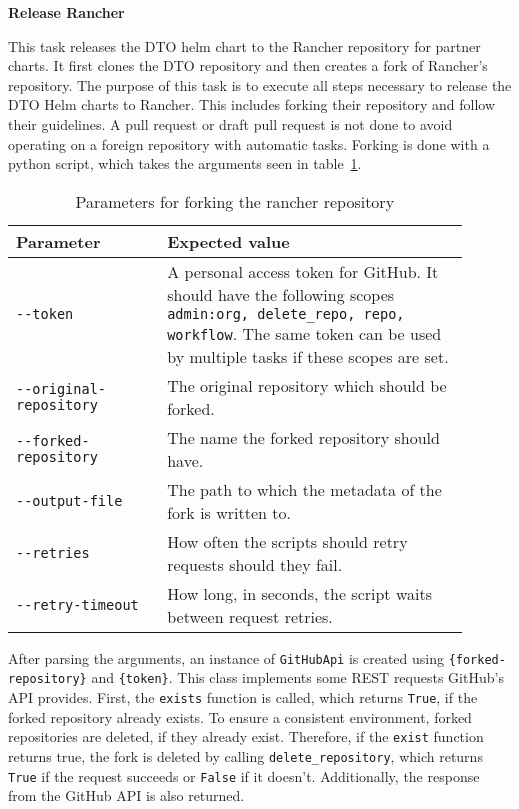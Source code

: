 \textbf{Release Rancher}

This task releases the DTO helm chart to the Rancher repository for partner charts.
It first clones the DTO repository and then creates a fork of Rancher's repository.
The purpose of this task is to execute all steps necessary to release the DTO Helm charts to Rancher.
This includes forking their repository and follow their guidelines.
A pull request or draft pull request is not done to avoid operating on a foreign repository with automatic tasks.
Forking is done with a python script, which takes the arguments seen in table~\ref{tab:parameters-for-forking-the-rancher-repository}.

\begin{table}[H]
    \centering
    \caption{Parameters for forking the rancher repository}
    \label{tab:parameters-for-forking-the-rancher-repository}
    \begin{tabular}{p{0.3\linewidth}|p{0.6\linewidth}}
        Parameter & Expected value \\
        \hline
        \verb|--token| & A personal access token for GitHub.
            It should have the following scopes \verb|admin:org, delete_repo, repo, workflow|.
            The same token can be used by multiple tasks if these scopes are set. \\
        \verb|--original-repository| & The original repository which should be forked. \\
        \verb|--forked-repository| & The name the forked repository should have. \\
        \verb|--output-file| & The path to which the metadata of the fork is written to. \\
        \verb|--retries| & How often the scripts should retry requests should they fail. \\
        \verb|--retry-timeout| & How long, in seconds, the script waits between request retries. \\
    \end{tabular}
\end{table}

After parsing the arguments, an instance of \verb|GitHubApi| is created using \verb|{forked-repository}| and \verb|{token}|.
This class implements some REST requests GitHub's API provides.
First, the \verb|exists| function is called, which returns \verb|True|, if the forked repository already exists.
To ensure a consistent environment, forked repositories are deleted, if they already exist.
Therefore, if the \verb|exist| function returns true, the fork is deleted by calling \verb|delete_repository|, which returns \verb|True| if the request succeeds or \verb|False| if it doesn't.
Additionally, the response from the GitHub API is also returned.

